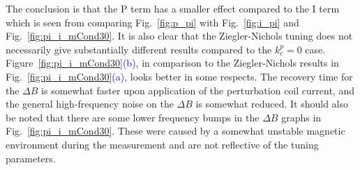 
The conclusion is that the P term has a smaller effect compared to the
I term which is seen from comparing Fig.~\ref{fig:p_pi} with
Fig.~\ref{fig:i_pi} and Fig.~\ref{fig:pi_i_mCond30}. It is also clear that the Ziegler-Nichols tuning does not necessarily give substantially different results compared to the $k_c^p=0$ case. Figure~\ref{fig:pi_i_mCond30}\textcolor{blue}{(b)}, in comparison to the Ziegler-Nichols results in Fig.~\ref{fig:pi_i_mCond30}\textcolor{blue}{(a)}, looks better in some respects. The recovery time for the $\Delta B$ is somewhat faster upon application of the perturbation coil current, and the general high-frequency noise on the $\Delta B$ is somewhat reduced. It should also be noted that there are some lower frequency bumps in the $\Delta B$ graphs in Fig.~\ref{fig:pi_i_mCond30}. These were caused by a somewhat unstable magnetic environment during the measurement and are not reflective of the tuning parameters.


